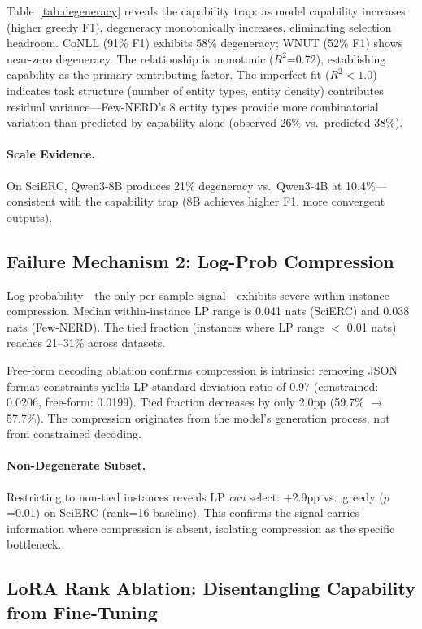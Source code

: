 \documentclass[11pt]{article}
\begin{document}
Table~\ref{tab:degeneracy} reveals the capability trap: as model capability increases (higher greedy F1), degeneracy monotonically increases, eliminating selection headroom. CoNLL (91\% F1) exhibits 58\% degeneracy; WNUT (52\% F1) shows near-zero degeneracy. The relationship is monotonic ($R^2$=0.72), establishing capability as the primary contributing factor. The imperfect fit ($R^2 < 1.0$) indicates task structure (number of entity types, entity density) contributes residual variance---Few-NERD's 8 entity types provide more combinatorial variation than predicted by capability alone (observed 26\% vs.\ predicted 38\%).

\paragraph{Scale Evidence.} On SciERC, Qwen3-8B produces 21\% degeneracy vs.\ Qwen3-4B at 10.4\%---consistent with the capability trap (8B achieves higher F1, more convergent outputs).

\subsection{Failure Mechanism 2: Log-Prob Compression}

Log-probability---the only per-sample signal---exhibits severe within-instance compression. Median within-instance LP range is 0.041 nats (SciERC) and 0.038 nats (Few-NERD). The tied fraction (instances where LP range $<$ 0.01 nats) reaches 21--31\% across datasets.

Free-form decoding ablation confirms compression is intrinsic: removing JSON format constraints yields LP standard deviation ratio of 0.97 (constrained: 0.0206, free-form: 0.0199). Tied fraction decreases by only 2.0pp (59.7\% $\rightarrow$ 57.7\%). The compression originates from the model's generation process, not from constrained decoding.

\paragraph{Non-Degenerate Subset.} Restricting to non-tied instances reveals LP \emph{can} select: +2.9pp vs.\ greedy ($p$=0.01) on SciERC (rank=16 baseline). This confirms the signal carries information where compression is absent, isolating compression as the specific bottleneck.

\subsection{LoRA Rank Ablation: Disentangling Capability from Fine-Tuning}
\end{document}
